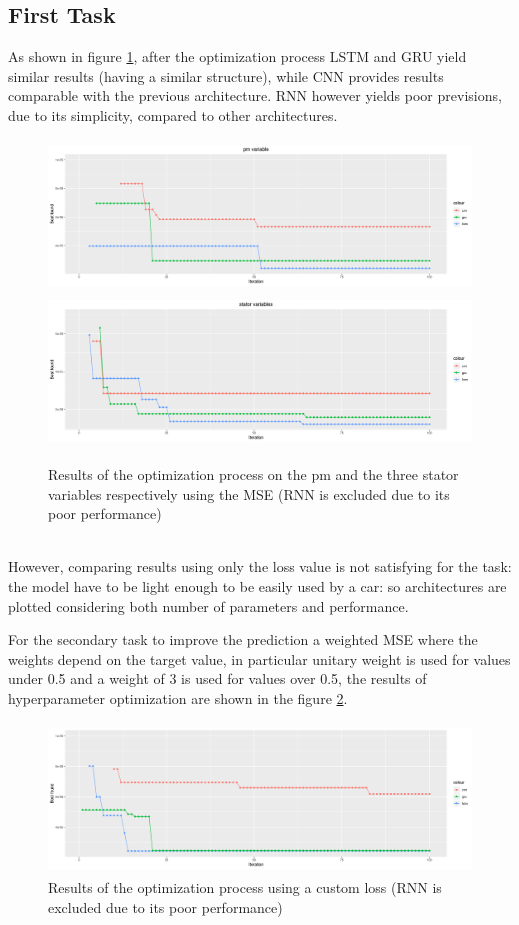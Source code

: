 \subsection{First Task}
As shown in figure \ref{fig:automl_mse}, after the optimization process LSTM and GRU yield similar results (having a similar structure), while CNN provides results comparable with the previous architecture.
RNN however yields poor previsions, due to its simplicity, compared to other architectures.
\begin{figure}[!h]
    \centering
    \includegraphics[width=\linewidth, height=4cm]{imgs/comparison_MSE.png}
    \includegraphics[width=\linewidth, height=4cm]{imgs/comparison_MSE_stator.png}
    \caption{Results of the optimization process on the pm and the three stator variables respectively using the MSE (RNN is excluded due to its poor performance)}
    \label{fig:automl_mse}
\end{figure}\\

However, comparing results using only the loss value is not satisfying for the task: the model have to be light enough to be easily used by a car: so architectures are plotted considering both number of parameters and performance.


For the secondary task to improve the prediction a weighted MSE where the weights depend on the target value, in particular unitary weight is used for values under 0.5 and a weight of 3 is used for values over 0.5, the results of hyperparameter optimization are shown in the figure \ref{fig:automl_custom}.
\begin{figure}[!h]
    \centering
    \includegraphics[width=\linewidth, height=4cm]{imgs/comparison_MSE_new_loss.png}
    \caption{Results of the optimization process using a custom loss (RNN is excluded due to its poor performance)}
    \label{fig:automl_custom}
\end{figure}\\
  
